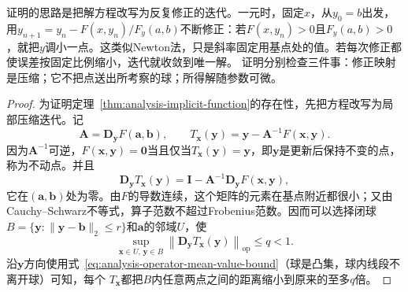 证明的思路是把解方程改写为反复修正的迭代。一元时，固定$x$，从$y_0=b$出发，用$y_{n+1}=y_n-F(x,y_n)/F_y(a,b)$不断修正：若$F(x,y_n)>0$且$F_y(a,b)>0$，就把$y$调小一点。这类似Newton法，只是斜率固定用基点处的值。若每次修正都使误差按固定比例缩小，迭代就收敛到唯一解。
证明分别检查三件事：修正映射是压缩；它不把点送出所考察的球；所得解随参数可微。
\begin{proof}
为证明定理~\ref{thm:analysis-implicit-function}的存在性，先把方程改写为局部压缩迭代。记
\[
 \bm{A}=\bm{D}_{\bm{y}}F(\bm{a},\bm{b}),
 \qquad
 T_{\bm{x}}(\bm{y})=\bm{y}-\bm{A}^{-1}F(\bm{x},\bm{y}).
\]
因为$\bm A^{-1}$可逆，$F(\bm{x},\bm{y})=\bm{0}$当且仅当$T_{\bm{x}}(\bm{y})=\bm{y}$，即$\bm y$是更新后保持不变的点，称为不动点。并且
\[
 \bm{D}_{\bm{y}}T_{\bm{x}}(\bm{y})=\bm{I}-\bm{A}^{-1}\bm{D}_{\bm{y}}F(\bm{x},\bm{y}),
\]
它在$(\bm{a},\bm{b})$处为零。由$F$的导数连续，这个矩阵的元素在基点附近都很小；又由Cauchy--Schwarz不等式，算子范数不超过Frobenius范数。因而可以选择闭球$B=\{\bm{y}:\lVert\bm{y}-\bm{b}\rVert_2\leq r\}$和$\bm{a}$的邻域$U$，使
\begin{equation}
  \sup_{\bm{x}\in U,\,\bm{y}\in B}
  \left\lVert
    \bm{D}_{\bm{y}}T_{\bm{x}}(\bm{y})
  \right\rVert_{\mathrm{op}}
  \leq q<1.
\label{eq:analysis-ift-uniform-contraction}
\end{equation}
沿$\bm{y}$方向使用式~\eqref{eq:analysis-operator-mean-value-bound}（球是凸集，球内线段不离开球）可知，每个
$T_{\bm{x}}$都把$B$内任意两点之间的距离缩小到原来的至多$q$倍。


\end{proof}
